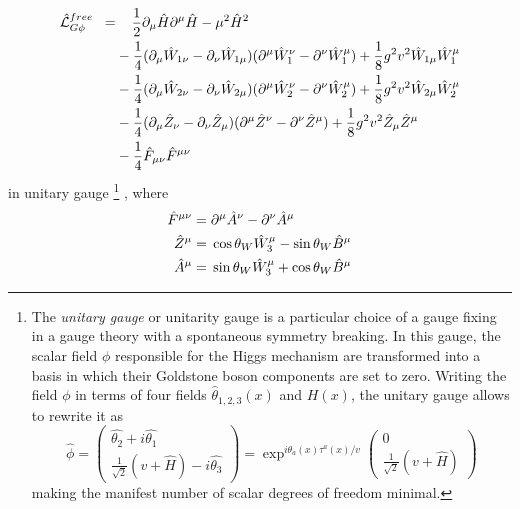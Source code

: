 \begin{align}
\begin{split}
\hat{\mathcal{L}}^{free}_{G\phi} \hspace{0.2cm} =& \hspace{0.4cm} \frac{1}{2}\partial_{\mu}\hat{H}\partial^{\mu}\hat{H}-\mu^2\hat{H}^2 \\
& -\frac{1}{4}(\partial_{\mu}\hat{W}_{1\nu}-\partial_{\nu}\hat{W}_{1\mu})(\partial^{\mu}\hat{W}_1^{\nu}-\partial^{\nu}\hat{W}_1^{\mu}) + \frac{1}{8}g^2v^2\hat{W}_{1\mu}\hat{W}_1^{\mu} \\
& -\frac{1}{4}(\partial_{\mu}\hat{W}_{2\nu}-\partial_{\nu}\hat{W}_{2\mu})(\partial^{\mu}\hat{W}_2^{\nu}-\partial^{\nu}\hat{W}_2^{\mu}) + \frac{1}{8}g^2v^2\hat{W}_{2\mu}\hat{W}_2^{\mu} \\
& -\frac{1}{4}(\partial_{\mu}\hat{Z}_{\nu}-\partial_{\nu}\hat{Z}_{\mu})(\partial^{\mu}\hat{Z}^{\nu}-\partial^{\nu}\hat{Z}^{\mu}) + \frac{1}{8}g^2v^2\hat{Z}_{\mu}\hat{Z}^{\mu} \\
& -\frac{1}{4}\hat{F}_{\mu\nu}\hat{F}^{\mu\nu}
\end{split}
\label{expanded_lagrangian}
\end{align}
in unitary gauge
\footnote{The \emph{unitary gauge} or unitarity gauge is a particular choice of a gauge fixing in a gauge theory with a spontaneous symmetry breaking. In this gauge, the scalar field $\phi$ responsible for the Higgs mechanism are transformed into a basis in which their Goldstone boson components are set to zero. Writing the field $\phi$ in terms of four fields $\hat{\theta}_{1,2,3}(x)$ and $H(x)$, the unitary gauge allows to rewrite it as
\footnotesize
\begin{equation*}
\hat{\phi} = \begin{pmatrix} 
		\hat{\theta_2} + i\hat{\theta_1} \\ 
		\frac{1}{\sqrt{2}}(v+\hat{H}) - i\hat{\theta_3} 
		\end{pmatrix}
		= \exp^{i\theta_a(x)\tau^a(x)/v}\begin{pmatrix} 
		0 \\ 
		\frac{1}{\sqrt{2}}(v+\hat{H}) 
		\end{pmatrix}
\end{equation*}
making the manifest number of scalar degrees of freedom minimal.}
, where
\begin{align}
\hat{F}^{\mu\nu} =& \hspace{0.1cm} \partial^{\mu}\hat{A}^{\nu} - \partial^{\nu}\hat{A}^{\mu} \\
\hat{Z}^{\mu} =& \hspace{0.1cm} \cos{\theta}_W\hat{W}_3^{\mu} - \sin{\theta}_W\hat{B}^{\mu} \\
\hat{A}^{\mu} =& \hspace{0.1cm} \sin{\theta}_W\hat{W}_3^{\mu} + \cos{\theta}_W\hat{B}^{\mu}
\end{align}

